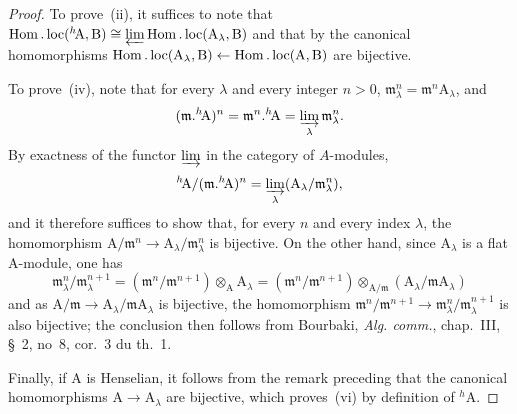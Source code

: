 \begin{proof}
To prove~(ii), it suffices to note that $\operatorname{Hom}.\operatorname{loc}({}^h\!\mathrm{A},\mathrm{B})\cong\varprojlim\operatorname{Hom}.\operatorname{loc}(\mathrm{A}_\lambda,\mathrm{B})$ and that by  the canonical homomorphisms $\operatorname{Hom}.\operatorname{loc}(\mathrm{A}_\lambda,\mathrm{B})\leftarrow\operatorname{Hom}.\operatorname{loc}(\mathrm{A},\mathrm{B})$ are bijective.

To prove~(iv), note that for every $\lambda$ and every integer $n>0$, $\mathfrak{m}_\lambda^n=\mathfrak{m}^n\mathrm{A}_\lambda$, and
\[
(\mathfrak{m}.{}^h\!\mathrm{A})^n=\mathfrak{m}^n.{}^h\!\mathrm{A}=\varinjlim_\lambda\mathfrak{m}_\lambda^n.
\]
By exactness of the functor $\varinjlim$ in the category of $A$-modules,
\[
{}^h\!\mathrm{A}/(\mathfrak{m}.{}^h\!\mathrm{A})^n=\varinjlim_\lambda(\mathrm{A}_\lambda/\mathfrak{m}_\lambda^n),
\]
and it therefore suffices to show that, for every $n$ and every index $\lambda$, the homomorphism $\mathrm{A}/\mathfrak{m}^n\to\mathrm{A}_\lambda/\mathfrak{m}_\lambda^n$ is bijective.
On the other hand, since $\mathrm{A}_\lambda$ is a flat A-module, one has
\[
  \mathfrak{m}_\lambda^n/\mathfrak{m}_\lambda^{n+1}=(\mathfrak{m}^n/\mathfrak{m}^{n+1})\otimes_{\mathrm{A}}\mathrm{A}_\lambda
  =(\mathfrak{m}^n/\mathfrak{m}^{n+1})\otimes_{\mathrm{A}/\mathfrak{m}}(\mathrm{A}_\lambda/\mathfrak{m}\mathrm{A}_\lambda)
\]
and as $\mathrm{A}/\mathfrak{m}\to\mathrm{A}_\lambda/\mathfrak{m}\mathrm{A}_\lambda$ is bijective, the homomorphism $\mathfrak{m}^n/\mathfrak{m}^{n+1}\to\mathfrak{m}_\lambda^n/\mathfrak{m}_\lambda^{n+1}$ is also bijective;
the conclusion then follows from Bourbaki, \emph{Alg. comm.}, chap.~III, \S~2, no~8, cor.~3 du th.~1.

Finally, if A is Henselian, it follows from the remark preceding  that the canonical homomorphisms $\mathrm{A}\to\mathrm{A}_\lambda$ are bijective, which proves~(vi) by definition of ${}^h\!\mathrm{A}$.
\end{proof}


